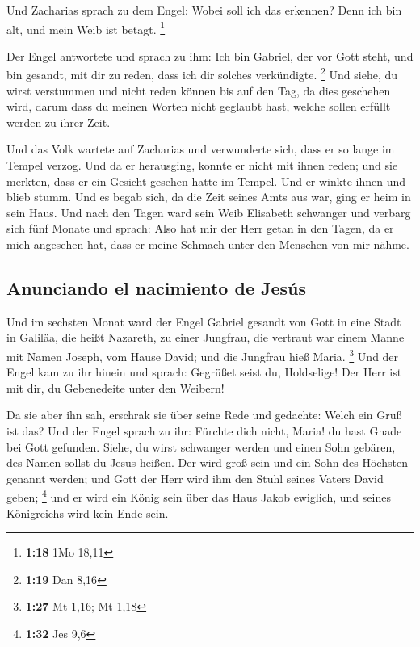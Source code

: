  Und Zacharias sprach zu dem Engel: Wobei soll ich das
erkennen? Denn ich bin alt, und mein Weib ist betagt. \footnote{\textbf{1:18}
  1Mo 18,11}

 Der Engel antwortete und sprach zu ihm: Ich bin Gabriel,
der vor Gott steht, und bin gesandt, mit dir zu reden, dass ich dir
solches verkündigte. \footnote{\textbf{1:19} Dan 8,16} 
Und siehe, du wirst verstummen und nicht reden können bis auf den Tag,
da dies geschehen wird, darum dass du meinen Worten nicht geglaubt hast,
welche sollen erfüllt werden zu ihrer Zeit.

 Und das Volk wartete auf Zacharias und verwunderte sich,
dass er so lange im Tempel verzog.  Und da er herausging,
konnte er nicht mit ihnen reden; und sie merkten, dass er ein Gesicht
gesehen hatte im Tempel. Und er winkte ihnen und blieb stumm.
 Und es begab sich, da die Zeit seines Amts aus war, ging
er heim in sein Haus.  Und nach den Tagen ward sein Weib
Elisabeth schwanger und verbarg sich fünf Monate und sprach:
 Also hat mir der Herr getan in den Tagen, da er mich
angesehen hat, dass er meine Schmach unter den Menschen von mir nähme.

\hypertarget{anunciando-el-nacimiento-de-jesuxfas}{%
\subsection{Anunciando el nacimiento de
Jesús}\label{anunciando-el-nacimiento-de-jesuxfas}}

 Und im sechsten Monat ward der Engel Gabriel gesandt von
Gott in eine Stadt in Galiläa, die heißt Nazareth,  zu
einer Jungfrau, die vertraut war einem Manne mit Namen Joseph, vom Hause
David; und die Jungfrau hieß Maria. \footnote{\textbf{1:27} Mt 1,16; Mt
  1,18}  Und der Engel kam zu ihr hinein und sprach:
Gegrüßet seist du, Holdselige! Der Herr ist mit dir, du Gebenedeite
unter den Weibern!

 Da sie aber ihn sah, erschrak sie über seine Rede und
gedachte: Welch ein Gruß ist das?  Und der Engel sprach
zu ihr: Fürchte dich nicht, Maria! du hast Gnade bei Gott gefunden.
 Siehe, du wirst schwanger werden und einen Sohn gebären,
des Namen sollst du Jesus heißen.  Der wird groß sein und
ein Sohn des Höchsten genannt werden; und Gott der Herr wird ihm den
Stuhl seines Vaters David geben; \footnote{\textbf{1:32} Jes 9,6}
 und er wird ein König sein über das Haus Jakob ewiglich,
und seines Königreichs wird kein Ende sein.

